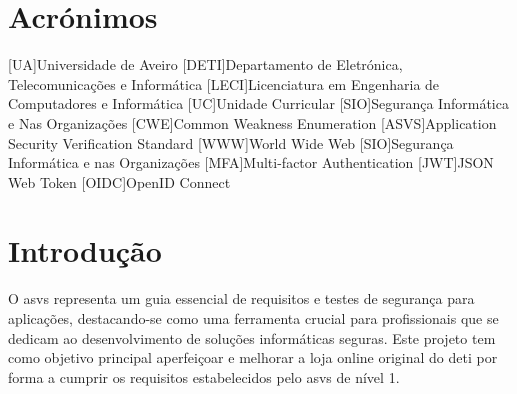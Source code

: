 
	
	
	
	
	
	

\renewcommand{\contentsname}{Índice}
\tableofcontents
\listoffigures
{}


\chapter*{Acrónimos}
\begin{acronym}

[UA]{Universidade de Aveiro}
[DETI]{Departamento de Eletrónica, Telecomunicações e Informática}
[LECI]{Licenciatura em Engenharia de Computadores e Informática}
[UC]{Unidade Curricular}
[SIO]{Segurança Informática e Nas Organizações} 
[CWE]{Common Weakness Enumeration}
[ASVS]{Application Security Verification Standard}
[WWW]{World Wide Web}
[SIO]{Segurança Informática e nas Organizações}
[MFA]{Multi-factor Authentication}
[JWT]{JSON Web Token}
[OIDC]{OpenID Connect}
\end{acronym}


\pagestyle{fancy}
\fancyhf{}
\chead{\titulo}
\cfoot{\thepage}
%
\chapter{Introdução}
\label{chap.Intro}

O \ac{asvs} representa um guia essencial de requisitos e testes de segurança para aplicações, destacando-se como uma ferramenta crucial para profissionais que se dedicam ao desenvolvimento de soluções informáticas seguras. Este projeto tem como objetivo principal aperfeiçoar e melhorar a loja online original do \ac{deti} por forma a cumprir os requisitos estabelecidos pelo \ac{asvs} de nível 1.

